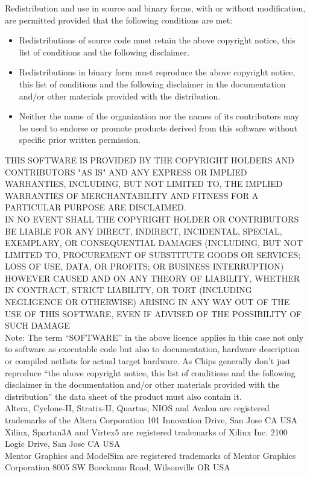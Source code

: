 \documentclass{ruschidoc}
\begin{document}
Redistribution and use in source and binary forms, with or without modification, are
permitted provided that the following conditions are met:
\begin{itemize}
\item Redistributions of source code must retain the above copyright notice, this
  list of conditions and the following disclaimer.
\item Redistributions in binary form must reproduce the above copyright notice, this
  list of conditions and the following disclaimer in the documentation and/or other
  materials provided with the distribution.
\item Neither the name of the organization nor the names of its contributors may be
  used to endorse or promote products derived from this software without specific
  prior written permission.
\end{itemize}
 THIS SOFTWARE IS PROVIDED BY THE COPYRIGHT HOLDERS AND CONTRIBUTORS "AS IS"
 AND ANY EXPRESS OR IMPLIED WARRANTIES, INCLUDING, BUT NOT LIMITED TO, THE
 IMPLIED WARRANTIES OF MERCHANTABILITY AND FITNESS FOR A PARTICULAR PURPOSE
 ARE DISCLAIMED. \\
IN NO EVENT SHALL THE COPYRIGHT HOLDER OR CONTRIBUTORS BE
 LIABLE FOR ANY DIRECT, INDIRECT, INCIDENTAL, SPECIAL, EXEMPLARY,
 OR CONSEQUENTIAL DAMAGES (INCLUDING, BUT NOT LIMITED TO, PROCUREMENT OF
 SUBSTITUTE GOODS OR SERVICES; LOSS OF USE, DATA, OR PROFITS; OR BUSINESS
 INTERRUPTION) HOWEVER CAUSED AND ON ANY THEORY OF LIABILITY, WHETHER IN
 CONTRACT, STRICT LIABILITY, OR TORT (INCLUDING NEGLIGENCE OR OTHERWISE)
 ARISING IN ANY WAY OUT OF THE USE OF THIS SOFTWARE, EVEN IF ADVISED OF
 THE POSSIBILITY OF SUCH DAMAGE\\

 Note: The term ``SOFTWARE'' in the above licence applies in this case not only to
 software as executable code but also to documentation, hardware description or
 compiled netlists for actual target hardware. As Chips generally don't just
 reproduce ``the above copyright notice, this list of conditions and the following
 disclaimer in the documentation and/or other materials provided with the
 distribution'' the data sheet of the product must also contain it.\\

 Altera, Cyclone-II, Stratix-II, Quartus, NIOS and Avalon are registered trademarks of the Altera
 Corporation
 101 Innovation Drive, San Jose CA USA \\
 Xilinx, Spartan3A and Virtex5 are registered trademarks of Xilinx Inc. 2100 Logic Drive, San Jose CA USA \\
 Mentor Graphics and ModelSim are registered trademarks of Mentor Graphics
 Corporation 8005 SW Boeckman Road, Wilsonville OR USA \newpage

\printglossaries 


\revisionTable
\end{document}
